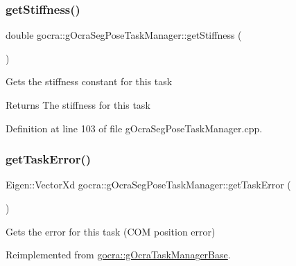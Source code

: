 \hypertarget{classgocra_1_1gOcraSegPoseTaskManager_a1fabad2f6aef0f4e3088225ba71555a5}{}\label{classgocra_1_1gOcraSegPoseTaskManager_a1fabad2f6aef0f4e3088225ba71555a5} 
\subsubsection{\texorpdfstring{get\+Stiffness()}{getStiffness()}}
{\footnotesize\ttfamily double gocra\+::g\+Ocra\+Seg\+Pose\+Task\+Manager\+::get\+Stiffness (\begin{DoxyParamCaption}{ }\end{DoxyParamCaption})}

Gets the stiffness constant for this task

\begin{DoxyReturn}{Returns}
The stiffness for this task 
\end{DoxyReturn}


Definition at line 103 of file g\+Ocra\+Seg\+Pose\+Task\+Manager.\+cpp.

\hypertarget{classgocra_1_1gOcraSegPoseTaskManager_a059b69af0a960110bb14863f0179b1cd}{}\label{classgocra_1_1gOcraSegPoseTaskManager_a059b69af0a960110bb14863f0179b1cd} 
\subsubsection{\texorpdfstring{get\+Task\+Error()}{getTaskError()}}
{\footnotesize\ttfamily Eigen\+::\+Vector\+Xd gocra\+::g\+Ocra\+Seg\+Pose\+Task\+Manager\+::get\+Task\+Error (\begin{DoxyParamCaption}{ }\end{DoxyParamCaption})\hspace{0.3cm}{\ttfamily [virtual]}}

Gets the error for this task (C\+OM position error) 

Reimplemented from \hyperlink{classgocra_1_1gOcraTaskManagerBase_a5c40a14b3a1d5a6519da422310d28f97}{gocra\+::g\+Ocra\+Task\+Manager\+Base}.



